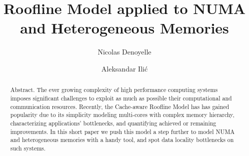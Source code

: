 \documentclass[runningheads,a4paper]{llncs}
\begin{document}
\title{Roofline Model applied to NUMA and Heterogeneous Memories}
\author{Nicolas Denoyelle \and Aleksandar Ili\'{c}}

\maketitle

\begin{abstract}

Abstract. The ever growing complexity of high performance computing systems imposes significant challenges to exploit as much as
possible their computational and communication resources.
Recently, the Cache-aware Roofline Model has has gained popularity due to its simplicity modeling multi-cores with complex memory
hierarchy, characterizing applications' bottlenecks, and quantifying achieved or remaining improvements.
In this short paper we push this model a step further to model NUMA and heterogeneous memories with a handy tool, and spot data
locality bottlenecks on such systems.

\end{abstract}
\end{document}
